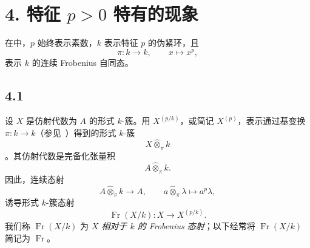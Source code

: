 
\section*{4. 特征 \(p>0\) 特有的现象}
\label{sga3:VIIB:4}
在中，\(p\) 始终表示素数，\(k\) 表示特征 \(p\) 的伪紧环，且
\[
  \pi:k\longrightarrow k,\qquad x\longmapsto x^p,
\]
表示 \(k\) 的连续 Frobenius 自同态。
\subsection*{4.1}
\label{sga3:VIIB:4.1}
设 \(X\) 是仿射代数为 \(A\) 的形式 \(k\)-簇。用 \(X^{(p/k)}\)，或简记 \(X^{(p)}\)，表示通过基变换 \(\pi:k\to k\)\textup{（参见\ ）}得到的形式 \(k\)-簇
\[
  X\widehat\otimes_{\pi}k
\]
。其仿射代数是完备化张量积
\[
  A\widehat\otimes_{\pi}k.
\]
因此，连续态射
\[
  A\widehat\otimes_{\pi}k\longrightarrow A,
  \qquad
  a\widehat\otimes_{\pi}\lambda
  \longmapsto
  a^p\lambda,
\]
诱导形式 \(k\)-簇态射
\[
  \operatorname{Fr}(X/k):
  X\longrightarrow X^{(p/k)}.
\]
我们称 \(\operatorname{Fr}(X/k)\) 为 \emph{\(X\) 相对于 \(k\) 的 Frobenius 态射}；以下经常将 \(\operatorname{Fr}(X/k)\) 简记为 \(\operatorname{Fr}\)。
